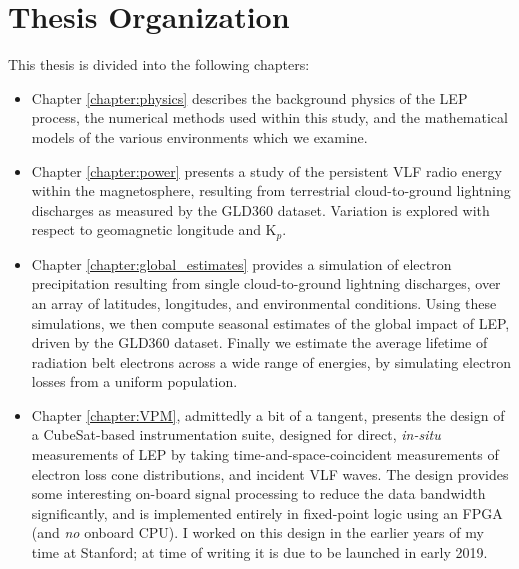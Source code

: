 \section{Thesis Organization}
This thesis is divided into the following chapters:
\begin{itemize}
\item Chapter \ref{chapter:physics} describes the background physics of the LEP process, the numerical methods used within this study, and the mathematical models of the various environments which we examine. 
\item Chapter \ref{chapter:power} presents a study of the persistent VLF radio energy within the magnetosphere, resulting from terrestrial cloud-to-ground lightning discharges as measured by the GLD360 dataset. Variation is explored with respect to geomagnetic longitude and K$_p$. 
\item Chapter \ref{chapter:global_estimates} provides a simulation of electron precipitation resulting from single cloud-to-ground lightning discharges, over an array of latitudes, longitudes, and environmental conditions. Using these simulations, we then compute seasonal estimates of the global impact of LEP, driven by the GLD360 dataset. Finally we estimate the average lifetime of radiation belt electrons across a wide range of energies, by simulating electron losses from a uniform population.

\item Chapter \ref{chapter:VPM}, admittedly a bit of a tangent, presents the design of a CubeSat-based instrumentation suite, designed for direct, \emph{in-situ} measurements of LEP by taking time-and-space-coincident measurements of electron loss cone distributions, and incident VLF waves. The design provides some interesting on-board signal processing to reduce the data bandwidth significantly, and is implemented entirely in fixed-point logic using an FPGA (and \emph{no} onboard CPU). I worked on this design in the earlier years of my time at Stanford; at time of writing it is due to be launched in early 2019.
\end{itemize}

